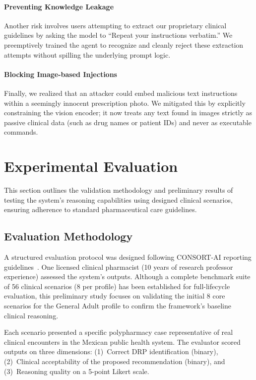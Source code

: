 \documentclass[9pt,conference]{IEEEtran}
\begin{document}
\paragraph{Preventing Knowledge Leakage}
Another risk involves users attempting to extract our proprietary clinical guidelines by asking the model to ``Repeat your instructions verbatim.'' We preemptively trained the agent to recognize and cleanly reject these extraction attempts without spilling the underlying prompt logic.

\paragraph{Blocking Image-based Injections}
Finally, we realized that an attacker could embed malicious text instructions within a seemingly innocent prescription photo. We mitigated this by explicitly constraining the vision encoder; it now treats any text found in images strictly as passive clinical data (such as drug names or patient IDs) and never as executable commands.

\section{Experimental Evaluation}
\label{sec:eval}

This section outlines the validation methodology and preliminary results of testing the system's reasoning capabilities using designed clinical scenarios, ensuring adherence to standard pharmaceutical care guidelines.

\subsection{Evaluation Methodology}

A structured evaluation protocol was designed following CONSORT-AI reporting guidelines~\cite{liu2023reporting}. One licensed clinical pharmacist (10 years of research professor experience) assessed the system's outputs. Although a complete benchmark suite of 56 clinical scenarios (8 per profile) has been established for full-lifecycle evaluation, this preliminary study focuses on validating the initial 8 core scenarios for the General Adult profile to confirm the framework's baseline clinical reasoning.

Each scenario presented a specific polypharmacy case representative of real clinical encounters in the Mexican public health system. The evaluator scored outputs on three dimensions: (1)~Correct DRP identification (binary), (2)~Clinical acceptability of the proposed recommendation (binary), and (3)~Reasoning quality on a 5-point Likert scale.
\end{document}
